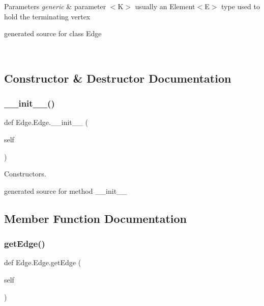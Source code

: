 \begin{DoxyParams}{Parameters}
{\em generic} & parameter $<$\+K$>$ usually an Element$<$\+E$>$ type used to hold the terminating vertex\begin{DoxyVerb}generated source for class Edge \end{DoxyVerb}
 \\
\hline
\end{DoxyParams}


\subsection{Constructor \& Destructor Documentation}
\hypertarget{class_edge_1_1_edge_a34341733ffb907488ec5b7498f668cb0}{}\label{class_edge_1_1_edge_a34341733ffb907488ec5b7498f668cb0} 
\subsubsection{\texorpdfstring{\+\_\+\+\_\+init\+\_\+\+\_\+()}{\_\_init\_\_()}}
{\footnotesize\ttfamily def Edge.\+Edge.\+\_\+\+\_\+init\+\_\+\+\_\+ (\begin{DoxyParamCaption}\item[{}]{self }\end{DoxyParamCaption})}



Constructors. 

\begin{DoxyVerb}generated source for method __init__ \end{DoxyVerb}
 

\subsection{Member Function Documentation}
\hypertarget{class_edge_1_1_edge_a889f02a79ded7ba366a0f1dfd7c6158a}{}\label{class_edge_1_1_edge_a889f02a79ded7ba366a0f1dfd7c6158a} 
\subsubsection{\texorpdfstring{get\+Edge()}{getEdge()}}
{\footnotesize\ttfamily def Edge.\+Edge.\+get\+Edge (\begin{DoxyParamCaption}\item[{}]{self }\end{DoxyParamCaption})}



